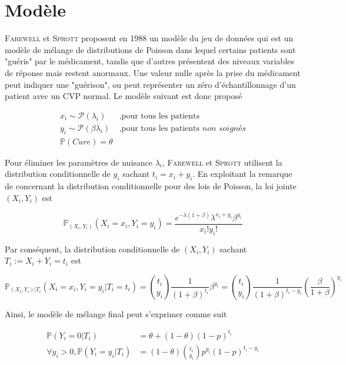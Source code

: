 \section{Modèle}

\textsc{Farewell} et \textsc{Sprott} proposent en 1988 un modèle du jeu de données \cite{Farewell1988} qui est un modèle de mélange de distributions de Poisson dans lequel certains patients sont "guéris" par le médicament, tandis que d'autres présentent des niveaux variables de réponse mais restent anormaux.
Une valeur nulle après la prise du médicament peut indiquer une "guérison", ou peut représenter un zéro d'échantillonnage d'un patient avec un CVP normal.
Le modèle suivant est donc proposé

\begin{align*}
    x_i \sim \mathcal P(\lambda_i) ~ &,\text{pour tous les patients} \\
    y_i \sim \mathcal P(\beta \lambda_i) ~ &,\text{pour tous les patients }\textit{non soignés} \\
    \mathbb P(Cure) = \theta
\end{align*}

Pour éliminer les paramètres de nuisance $\lambda_i$, \textsc{Farewell} et \textsc{Sprott} utilisent la distribution conditionnelle de $y_i$ sachant $t_i = x_i + y_i$.
En exploitant la remarque de \cite{Cox1979} concernant la distribution conditionnelle pour des lois de Poisson, la loi jointe $(X_i, Y_i)$ est

\begin{equation*}
    \mathbb P_{(X_i, Y_i)}(X_i = x_i, Y_i = y_i) = \frac{e^{-\lambda(1 + \beta)} \lambda^{x_i + y_i} \beta^{y_i}}{x_i! y_i!}
\end{equation*}

Par conséquent, la distribution conditionnelle de $(X_i, Y_i)$ sachant $T_i := X_i + Y_i = t_i$ est

\begin{equation*}
    \mathbb P_{(X_i, Y_i) | T_i}(X_i = x_i, Y_i = y_i | T_i = t_i) = \binom{t_i}{y_i} \frac{1}{(1 + \beta)^{t_i}} \beta^{y_i} = \binom{t_i}{y_i} \frac{1}{(1 + \beta)^{t_i - y_i}} \left(\frac{\beta}{1 + \beta}\right)^{y_i}
\end{equation*}

Ainsi, le modèle de mélange final peut s'exprimer comme suit

\begin{align*}
    \mathbb P(Y_i = 0 | T_i) &= \theta + (1 - \theta)(1 - p)^{t_i} \\
    \forall y_i > 0, \mathbb P(Y_i = y_i | T_i) &= (1-\theta)\binom{t_i}{y_i} p^{y_i} (1-p)^{t_i-y_i}
\end{align*}